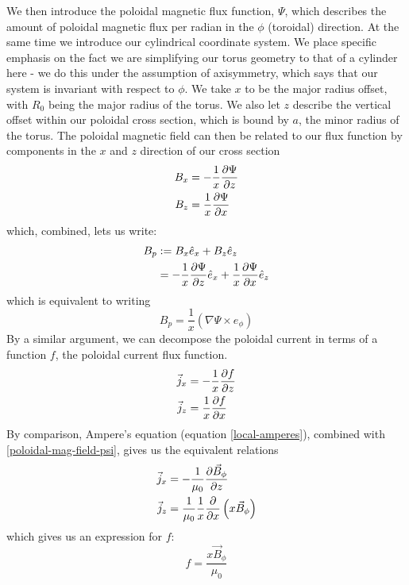 We then introduce the poloidal magnetic flux function, $\Psi$, which describes the amount of poloidal magnetic flux 
per radian in the $\phi$ (toroidal) direction. At the same time we introduce our cylindrical coordinate system. 
We place specific emphasis on the fact we are simplifying our torus geometry to that of a cylinder here - we do this 
under the assumption of axisymmetry, which says that our system is invariant with respect to $\phi$. We take $x$ to be the 
major radius offset, with $R_0$ being the major radius of the torus. We also let $z$ describe the vertical offset within our poloidal 
cross section, which is bound by $a$, the minor radius of the torus. The poloidal magnetic field can then be related 
to our flux function by components in the $x$ and $z$ direction of our cross section
\begin{align}
    B_x &= -\frac{1}{x} \pdv{\Psi}{z} \\
    B_z &= \frac{1}{x} \pdv{\Psi}{x}
\end{align}
which, combined, lets us write:
\begin{align}
    B_p &:= B_x \hat{e}_x + B_z \hat{e}_z \\
    &= -\frac{1}{x} \pdv{\Psi}{z} \hat{e}_x + \frac{1}{x} \pdv{\Psi}{x} \hat{e}_z
\end{align}
which is equivalent to writing 
\begin{equation}
    \label{poloidal-mag-field-psi} B_p = \frac{1}{x} \left ( \nabla \Psi \times e_{\phi} \right )
\end{equation}
By a similar argument, we can decompose the poloidal current in terms of a function $f$, the poloidal current 
flux function.
\begin{align}
    \label{current-1} \vec{j}_{x} &= -\frac{1}{x} \pdv{f}{z} \\
    \label{current-2} \vec{j}_{z} &= \frac{1}{x} \pdv{f}{x}
\end{align}
By comparison, Ampere's equation (equation \ref{local-amperes}), combined with \ref{poloidal-mag-field-psi}, gives us the equivalent relations
\begin{align}
    \vec{j}_{x} &= -\frac{1}{\mu_0} \pdv{\vec{B}_{\phi}}{z} \\
    \vec{j}_{z} &= \frac{1}{\mu_0}\frac{1}{x} \pdv{}{x} \left ( x \vec{B}_{\phi} \right )
\end{align}
which gives us an expression for $f$:
\begin{equation}
    f = \frac{x \vec{B}_{\phi}}{\mu_0}
\end{equation}
